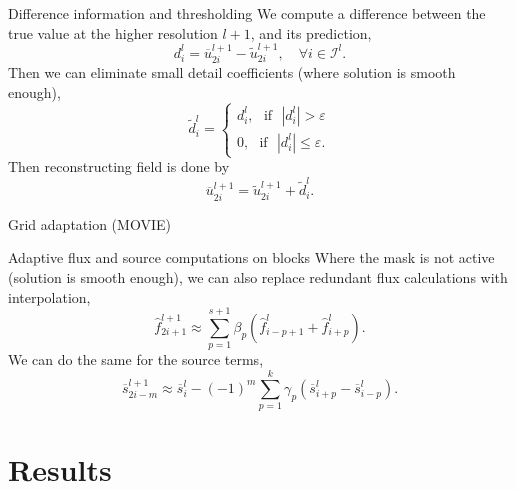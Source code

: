 \documentclass{beamer}
\begin{document}
\begin{frame}{Difference information and thresholding}
    We compute a difference between the true value at the higher resolution
    $l+1$, and its prediction,
    \begin{equation}
        d^{l}_{i} = \overline{u}^{l+1}_{2i} - \tilde{u}^{l+1}_{2i}, \quad \forall i \in \bm{\mathcal{I}}^{l}.
    \end{equation}
    Then we can eliminate small detail coefficients (where solution is smooth
    enough),
    \begin{equation}
        \tilde{d}^{l}_{i} =
            \begin{cases}
                d^{l}_{i}, \text{ } \text{if} \text{ } |d^{l}_{i}| > \varepsilon \\
                0, \text{ } \text{if} \text{ } |d^{l}_{i}| \leq
                \varepsilon.
            \end{cases}
    \end{equation}
    Then reconstructing field is done by
    \begin{equation*}
        \overline{u}^{l+1}_{2i} = \tilde{u}^{l+1}_{2i} + \tilde{d}^{l}_{i}.
    \end{equation*}
\end{frame}

\begin{frame}{Grid adaptation}
    (MOVIE)
\end{frame}

\begin{frame}{Adaptive flux and source computations on blocks}
    Where the mask is not active (solution is smooth enough), we can also
    replace redundant flux calculations with interpolation,
    \begin{equation}
        \hat{f}_{2i+1}^{l+1} \approx \sum_{p=1}^{s+1} \beta_{p} \left(
        \hat{f}^{l}_{i-p+1} + \hat{f}^{l}_{i+p} \right).
    \end{equation}
    We can do the same for the source terms,
    \begin{equation}
        \overline{s}_{2i-m}^{l+1} \approx \overline{s}_{i}^{l} - (-1)^{m} \sum_{p=1}^{k} \gamma_{p} \left(
            \overline{s}^{l}_{i+p} - \overline{s}^{l}_{i-p} \right).
    \end{equation}
\end{frame}

\section{Results}
\end{document}
